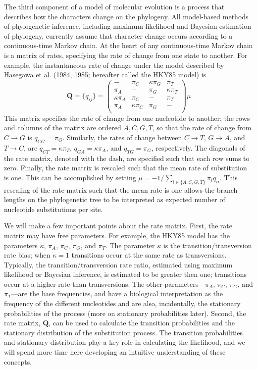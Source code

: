 \documentclass{svmult}
\begin{document}
The third component of a model of molecular evolution is a process that describes how the characters change on the
phylogeny. All model-based methods of phylogenetic inference, including maximum likelihood and Bayesian estimation
of phylogeny, currently assume that character change occurs according to a continuous-time Markov chain. At the heart
of any continuous-time Markov chain is a matrix of rates, specifying the rate of change from one state to another. For
example, the instantaneous rate of change under the model described by Hasegawa et al. (1984, 1985; hereafter called the HKY85 model) is
\begin{equation*}
{\mathbf Q} = \{q_{ij}\} = \left( \begin{array}{cccc}
-               &  \pi_C & \kappa \pi_G & \pi_T \\
\pi_A & -               & \pi_G & \kappa \pi_T \\
\kappa \pi_A & \pi_C & -               & \pi_T \\
\pi_A & \kappa \pi_C & \pi_G & -               \\
\end{array} \right) \mu
\end{equation*}
This matrix specifies the rate of change from one nucleotide to another; the rows and columns of the matrix are
ordered $A, C, G, T$, so that the rate of change from $C \rightarrow G$ is $q_{CG} = \pi_G$. Similarly, the rates
of change between $C \rightarrow T$, $G \rightarrow A$, and $T \rightarrow C$, are $q_{CT} = \kappa \pi_T$,
$q_{GA} = \kappa \pi_A$, and $q_{TG} = \pi_G$, respectively. 
The diagonals of the rate matrix, denoted with the
dash, are specified such that each row sums to zero. Finally, the rate matrix is rescaled such that the mean rate of
substitution is one. This can be accomplished by setting $\mu = -1 / \sum_{i\in \{A,C,G,T\}} \pi_i q_{ii}$. This rescaling of the rate matrix such that the mean
rate is one allows the branch lengths on the phylogenetic tree to be interpreted as expected number of nucleotide
substitutions per site.

We will make a few important points about the rate matrix. First, the rate matrix may have free parameters. For example,
the HKY85 model has the parameters $\kappa$, $\pi_A$, $\pi_C$, $\pi_G$, and $\pi_T$. 
The parameter $\kappa$ is the transition/transversion rate bias; when $\kappa = 1$ transitions occur at the same rate as transversions.
Typically, the transition/transversion rate ratio, estimated using maximum likelihood or Bayesian inference, is estimated
to be greater then one; transitions occur at a higher rate than transversions.
The other parameters---$\pi_A$, $\pi_C$, $\pi_G$, and $\pi_T$---are the base frequencies, and have a biological interpretation
as the frequency of the different nucleotides and are also, incidentally, the stationary probabilities of the process (more on stationary probabilities
later).
Second, the rate matrix, ${\mathbf Q}$, can be used to calculate
the transition probabilities and the stationary distribution of the substitution process. The transition probabilities and
stationary distribution play a key role in calculating the likelihood, and we will spend more time here developing an intuitive
understanding of these concepts.
\end{document}
